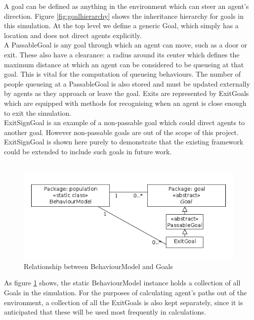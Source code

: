 A goal can be defined as anything in the environment which can steer an agent's direction. Figure \ref{fig:goalhierarchy} shows the inheritance hierarchy for goals in this simulation. At the top level we define a generic Goal, which simply has a location and does not direct agents explicitly.
\\
A PassableGoal is any goal through which an agent can move, such as a door or exit. These also have a clearance: a radius around its center which defines the maximum distance at which an agent can be considered to be queueing at that goal. This is vital for the computation of queueing behaviours. The number of people queueing at a PassableGoal is also stored and must be updated externally by agents as they approach or leave the goal.
Exits are represented by ExitGoals which are equipped with methods for recognising when an agent is close enough to exit the simulation.
\\
ExitSignGoal is an example of a non-passable goal which could direct agents to another goal. However non-passable goals are out of the scope of this project. ExitSignGoal is shown here purely to demonstrate that the existing framework could be extended to include such goals in future work.
\\
\\
\begin{figure}[here]
\centering
\includegraphics[scale=0.7]{../UMLDiagrams/BehaviourModelToGoalModel.png}
\caption{Relationship between BehaviourModel and Goals}
\label{fig:behaviourtogoalmodel}
\end{figure}

As figure \ref{fig:behaviourtogoalmodel} shows, the static BehaviourModel instance holds a collection of all Goals in the simulation. For the purposes of calculating agent's paths out of the environment, a collection of all the ExitGoals is also kept separately, since it is anticipated that these will be used most frequently in calculations.\\

%

